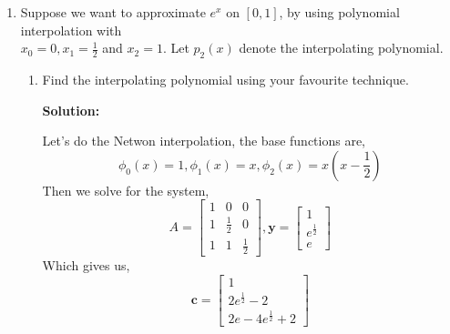 \documentclass[11pt]{article}
\newenvironment{solution}
  {\par\noindent\textbf{Solution:}\par}
  {\par}
\begin{document}
\begin{enumerate}
\begin{enumerate}
\begin{solution}
    Giving us the interpolating cubic polynomial,
    $$\therefore p(x) = 1 + \frac{1}{2}x(x+1) -\frac{2}{3}x(x-1)(x+1)$$
    \end{solution} 
\item Show that the three representations give the same polynomial.

  \begin{solution}
    Let's first look at the polynomial from (a),
    $$p_a(x) = 1 + \frac{7}{6}x+\frac{1}{2}x^2-\frac{2}{3}x^3$$
    from (b),
    $$p_b(x) = -\frac{x(x-1)(x-2)}{6} +\frac{(x+1)(x-1)(x-2)}{2} -  x(x+1)(x-2) $$
    $$= (-\frac{1}{6}x^3+\frac{1}{2}x^2-\frac{1}{3}x) + (\frac{1}{2}x^3-x^2-\frac{1}{2}x+1) - (x^3-x^2-2x)$$
    $$=1 +  \frac{7}{6}x + \frac{1}{2}x^2 -\frac{2}{3}x^3$$
    from (c),
    $$p_c(x) = 1 + \frac{1}{2}x(x+1) -\frac{2}{3}x(x-1)(x+1) $$
    $$= 1 + \frac{1}{2}x + \frac{1}{2}x^2 - \frac{2}{3}x^3 + \frac{2}{3}x = 1 + \frac{7}{6}x + \frac{1}{2}x^2 - \frac{2}{3}x^3$$
    Thus, we can see that $p_a(x) = p_b(x) = p_c(x)$, showing the three representations give the same polynomial.
  \end{solution}

  \end{enumerate}

\item Suppose we want to approximate $e^x$ on $[0,1]$, by using polynomial
interpolation with \\ $x_0=0, x_1=\frac12$ and $x_2=1$. Let $p_2(x)$ denote
the interpolating polynomial.
\begin{enumerate}
\item Find the interpolating polynomial using your favourite technique.
  \begin{solution}
    Let's do the Netwon interpolation, the base functions are,
    $$\phi_0(x) = 1, \phi_1(x) = x, \phi_2(x) = x(x-\frac{1}{2})$$
    Then we solve for the system,
    $$A = 
      \begin{bmatrix}
        1 & 0 & 0 \\ 
        1 & \frac{1}{2} & 0 \\ 
        1 & 1 & \frac{1}{2}
      \end{bmatrix}, \textbf{y} = \begin{bmatrix}
        1 \\ 
        e^{\frac{1}{2}} \\  
        e
      \end{bmatrix}$$
  Which gives us,
  $$\textbf{c} = \begin{bmatrix} 1 \\ 2e^{\frac{1}{2}} - 2 \\ 2e-4e^{\frac{1}{2}} + 2\end{bmatrix}$$


\end{solution}
\end{enumerate}
\end{enumerate}
\end{document}
